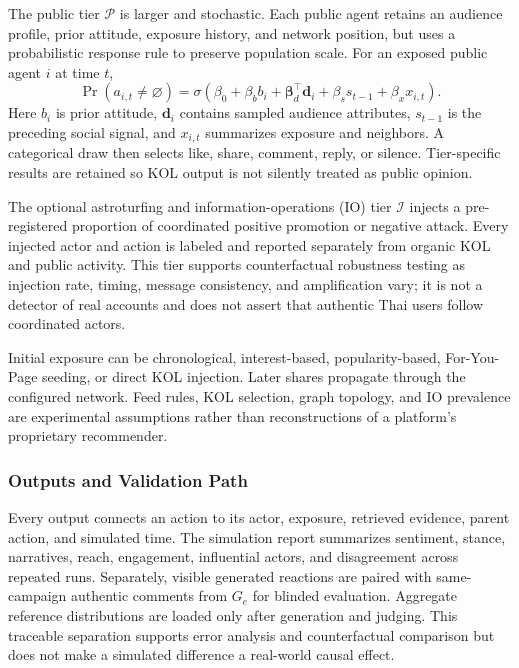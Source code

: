 \documentclass[conference]{IEEEtran}
\begin{document}
The public tier $\mathcal{P}$ is larger and stochastic. Each public agent
retains an audience profile, prior attitude, exposure history, and network
position, but uses a probabilistic response rule to preserve population scale.
For an exposed public agent $i$ at time $t$,
\begin{equation}
 \Pr(a_{i,t}\!\ne\!\varnothing)=\sigma(\beta_0+\beta_b b_i+
 \boldsymbol{\beta}_d^\top\mathbf d_i+\beta_s s_{t-1}+\beta_x x_{i,t}).
\end{equation}
Here $b_i$ is prior attitude, $\mathbf d_i$ contains sampled audience
attributes, $s_{t-1}$ is the preceding social signal, and $x_{i,t}$ summarizes
exposure and neighbors. A categorical draw then selects like, share, comment,
reply, or silence. Tier-specific results are retained so KOL output is not
silently treated as public opinion.

The optional astroturfing and information-operations (IO) tier $\mathcal{I}$
injects a pre-registered proportion of coordinated positive promotion or
negative attack. Every injected actor and action is labeled and reported
separately from organic KOL and public activity. This tier supports
counterfactual robustness testing as injection rate, timing, message
consistency, and amplification vary; it is not a detector of real accounts and
does not assert that authentic Thai users follow coordinated actors.

Initial exposure can be chronological, interest-based, popularity-based,
For-You-Page seeding, or direct KOL injection. Later shares propagate through
the configured network. Feed rules, KOL selection, graph topology, and IO
prevalence are experimental assumptions rather than reconstructions of a
platform's proprietary recommender.

\subsubsection{Outputs and Validation Path}

Every output connects an action to its actor, exposure, retrieved evidence,
parent action, and simulated time. The simulation report summarizes sentiment,
stance, narratives, reach, engagement, influential actors, and disagreement
across repeated runs. Separately, visible generated reactions are paired with
same-campaign authentic comments from $G_e$ for blinded evaluation. Aggregate
reference distributions are loaded only after generation and judging. This
traceable separation supports error analysis and counterfactual comparison but
does not make a simulated difference a real-world causal effect.
\end{document}
